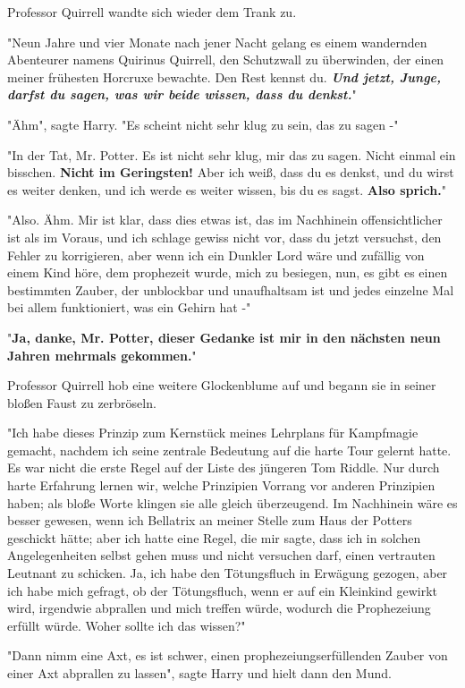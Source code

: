 {Professor Quirrell wandte sich wieder dem Trank zu.

"Neun Jahre und vier Monate nach jener Nacht gelang es einem wandernden Abenteurer namens Quirinus Quirrell, den Schutzwall zu überwinden, der einen meiner frühesten Horcruxe bewachte. Den Rest kennst du. \textbf{\emph{Und jetzt, Junge, darfst du sagen, was wir beide wissen, dass du denkst.}}"

"Ähm", sagte Harry. "Es scheint nicht sehr klug zu sein, das zu sagen -"

"In der Tat, Mr. Potter. Es ist nicht sehr klug, mir das zu sagen. Nicht einmal ein bisschen. \textbf{Nicht im Geringsten!} Aber ich weiß, dass du es denkst, und du wirst es weiter denken, und ich werde es weiter wissen, bis du es sagst. \textbf{Also sprich.}"

"Also. Ähm. Mir ist klar, dass dies etwas ist, das im Nachhinein offensichtlicher ist als im Voraus, und ich schlage gewiss nicht vor, dass du jetzt versuchst, den Fehler zu korrigieren, aber wenn ich ein Dunkler Lord wäre und zufällig von einem Kind höre, dem prophezeit wurde, mich zu besiegen, nun, es gibt es einen bestimmten Zauber, der unblockbar und unaufhaltsam ist und jedes einzelne Mal bei allem funktioniert, was ein Gehirn hat -"

"\textbf{Ja, danke, Mr. Potter, dieser Gedanke ist mir in den nächsten neun Jahren mehrmals gekommen.}"

Professor Quirrell hob eine weitere Glockenblume auf und begann sie in seiner bloßen Faust zu zerbröseln.

"Ich habe dieses Prinzip zum Kernstück meines Lehrplans für Kampfmagie gemacht, nachdem ich seine zentrale Bedeutung auf die harte Tour gelernt hatte. Es war nicht die erste Regel auf der Liste des jüngeren Tom Riddle. Nur durch harte Erfahrung lernen wir, welche Prinzipien Vorrang vor anderen Prinzipien haben; als bloße Worte klingen sie alle gleich überzeugend. Im Nachhinein wäre es besser gewesen, wenn ich Bellatrix an meiner Stelle zum Haus der Potters geschickt hätte; aber ich hatte eine Regel, die mir sagte, dass ich in solchen Angelegenheiten selbst gehen muss und nicht versuchen darf, einen vertrauten Leutnant zu schicken. Ja, ich habe den Tötungsfluch in Erwägung gezogen, aber ich habe mich gefragt, ob der Tötungsfluch, wenn er auf ein Kleinkind gewirkt wird, irgendwie abprallen und mich treffen würde, wodurch die Prophezeiung erfüllt würde. Woher sollte ich das wissen?"

"Dann nimm eine Axt, es ist schwer, einen prophezeiungserfüllenden Zauber von einer Axt abprallen zu lassen", sagte Harry und hielt dann den Mund.

}
